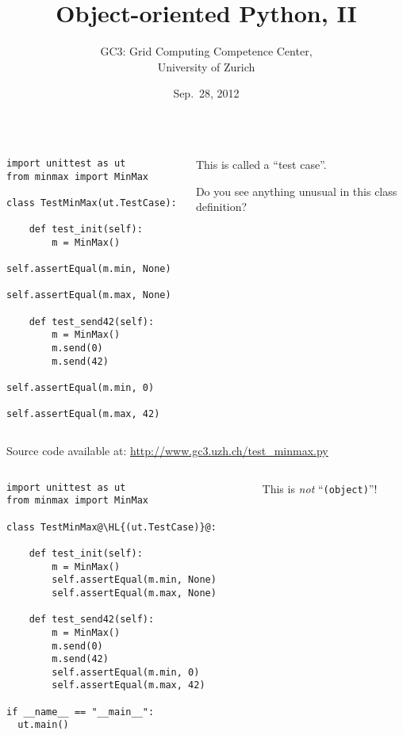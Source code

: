 \documentclass[english,serif,mathserif,xcolor=pdftex,dvipsnames,table]{beamer}
\title[OOP2]{%
  Object-oriented Python, II
}
\author[GC3]{%
  GC3: Grid Computing Competence Center, \\
  University of Zurich
}
\date{Sep.~28, 2012}
\begin{document}
\maketitle


\begin{frame}[fragile]
  \begin{columns}[t]
    \begin{column}{0.5\textwidth}
\begin{lstlisting}
import unittest as ut
from minmax import MinMax

class TestMinMax(ut.TestCase):

    def test_init(self):
        m = MinMax()
        self.assertEqual(m.min, None)
        self.assertEqual(m.max, None)

    def test_send42(self):
        m = MinMax()
        m.send(0)
        m.send(42)
        self.assertEqual(m.min, 0)
        self.assertEqual(m.max, 42)
\end{lstlisting}
    \end{column}
    \begin{column}{0.5\textwidth}
      \raggedleft
      This is called a ``test case''.

      \+
      Do you see anything unusual in this class definition?
    \end{column}
  \end{columns}

  {\small Source code available at:
    \url{http://www.gc3.uzh.ch/test_minmax.py}}
\end{frame}


\begin{frame}[fragile]
  \begin{columns}[t]
    \begin{column}{0.5\textwidth}
\begin{lstlisting}
import unittest as ut
from minmax import MinMax

class TestMinMax@\HL{(ut.TestCase)}@:

    def test_init(self):
        m = MinMax()
        self.assertEqual(m.min, None)
        self.assertEqual(m.max, None)

    def test_send42(self):
        m = MinMax()
        m.send(0)
        m.send(42)
        self.assertEqual(m.min, 0)
        self.assertEqual(m.max, 42)

if __name__ == "__main__":
  ut.main()
\end{lstlisting}
    \end{column}
    \begin{column}{0.5\textwidth}
      \raggedleft
      This is \emph{not} ``\texttt{(object)}''!
    \end{column}
  \end{columns}
\end{frame}
\end{document}
